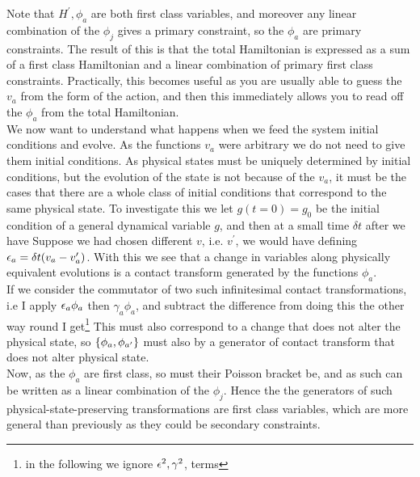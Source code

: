 \documentclass{article}
\begin{document}
Note that $H^\prime, \phi_a$ are both first class variables, and moreover any linear combination of the $\phi_j$ gives a primary constraint, so the $\phi_a$ are primary constraints. The result of this is that the total Hamiltonian is expressed as a sum of a first class Hamiltonian and a linear combination of primary first class constraints. Practically, this becomes useful as you are usually able to guess the $v_a$ from the form of the action, and then this immediately allows you to read off the $\phi_a$ from the total Hamiltonian. \\
We now want to understand what happens when we feed the system initial conditions and evolve. As the functions $v_a$ were arbitrary we do not need to give them initial conditions. As physical states must be uniquely determined by initial conditions, but the evolution of the state is not because of the $v_a$, it must be the cases that there are a whole class of initial conditions that correspond to the same physical state. To investigate this we let $g(t=0) = g_0$ be the initial condition of a general dynamical variable $g$, and then at a small time $\delta t$ after we have 
Suppose we had chosen different $v$, i.e. $v^\prime$, we would have 
defining $\eps_a = \delta t(v_a - v^\prime_a)$. With this we see that a change in variables along physically equivalent evolutions is a contact transform generated by the functions $\phi_a$. \\
If we consider the commutator of two such infinitesimal contact transformations, i.e I apply $\eps_a \phi_a$ then $\gamma_a \phi_a$, and subtract the difference from doing this the other way round I get\footnote{in the following we ignore $\eps^2, \gamma^2$, terms } 
This must also correspond to a change that does not alter the physical state, so $\acomm[\phi_a]{\phi_{a^\prime}}$ must also by a generator of contact transform that does not alter physical state. \\
Now, as the $\phi_a$ are first class, so must their Poisson bracket be, and as such can be written as a linear combination of the $\phi_j$. Hence the the generators of such physical-state-preserving transformations are first class variables, which are more general than previously as they could be secondary constraints. 
\end{document}

